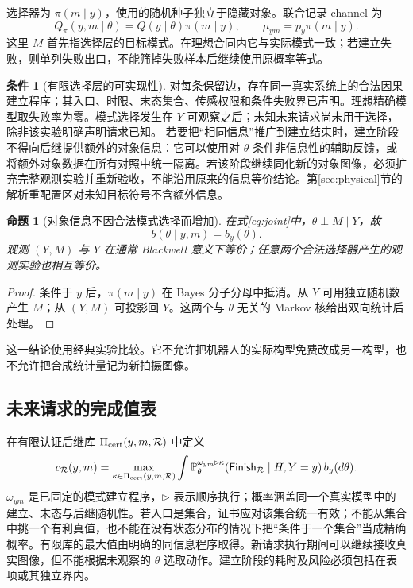 \documentclass[UTF8,11pt,a4paper,fontset=fandol]{ctexart}
\numberwithin{equation}{section}
\newtheorem{proposition}[theorem]{命题}
\theoremstyle{definition}
\newtheorem{assumption}[theorem]{条件}
\newcommand{\Pp}{\mathbb P}
\begin{document}
选择器为 $\pi(m\mid y)$，使用的随机种子独立于隐藏对象。联合记录 channel 为
\begin{equation}
Q_\pi(y,m\mid\theta)=Q(y\mid\theta)\pi(m\mid y),
\qquad
\mu_{ym}=p_y\pi(m\mid y).
\label{eq:joint}
\end{equation}
这里 $M$ 首先指选择层的目标模式。在理想合同内它与实际模式一致；若建立失败，则单列失败出口，不能筛掉失败样本后继续使用原概率等式。

\begin{assumption}[有限选择层的可实现性]
\label{ass:realizable}
对每条保留边，存在同一真实系统上的合法因果建立程序；其入口、时限、末态集合、传感权限和条件失败界已声明。理想精确模型取失败率为零。模式选择发生在 $Y$ 可观察之后；未知未来请求尚未用于选择，除非该实验明确声明请求已知。
若要把“相同信息”推广到建立结束时，建立阶段不得向后继提供额外的对象信息：它可以使用对 $\theta$ 条件非信息性的辅助反馈，或将额外对象数据在所有对照中统一隔离。若该阶段继续同化新的对象图像，必须扩充完整观测实验并重新验收，不能沿用原来的信息等价结论。第\ref{sec:physical}节的解析重配置区对未知目标符号不含额外信息。
\end{assumption}

\begin{proposition}[对象信息不因合法模式选择而增加]
\label{prop:blackwell}
在式\eqref{eq:joint}中，$\theta\perp M\mid Y$，故
\begin{equation}
b(\theta\mid y,m)=b_y(\theta).
\end{equation}
观测 $(Y,M)$ 与 $Y$ 在通常 Blackwell 意义下等价；任意两个合法选择器产生的观测实验也相互等价。
\end{proposition}
\begin{proof}
条件于 $y$ 后，$\pi(m\mid y)$ 在 Bayes 分子分母中抵消。从 $Y$ 可用独立随机数产生 $M$；从 $(Y,M)$ 可投影回 $Y$。这两个与 $\theta$ 无关的 Markov 核给出双向统计后处理。\end{proof}
这一结论使用经典实验比较\cite{blackwellmodern}。它不允许把机器人的实际构型免费改成另一构型，也不允许把合成统计量记为新拍摄图像。

\subsection{未来请求的完成值表}
在有限认证后继库 $\Pi_{\rm cert}(y,m,\mathcal R)$ 中定义
\begin{equation}
c_{\mathcal R}(y,m)=
\max_{\kappa\in\Pi_{\rm cert}(y,m,\mathcal R)}
\int\Pp_\theta^{\omega_{ym}\triangleright\kappa}
(\mathsf{Finish}_{\mathcal R}\mid H,Y=y)\,b_y(d\theta).
\label{eq:c}
\end{equation}
$\omega_{ym}$ 是已固定的模式建立程序，$\triangleright$ 表示顺序执行；概率涵盖同一个真实模型中的建立、末态与后继随机性。若入口是集合，证书应对该集合统一有效；不能从集合中挑一个有利真值，也不能在没有状态分布的情况下把“条件于一个集合”当成精确概率。有限库的最大值由明确的同信息程序取得。新请求执行期间可以继续接收真实图像，但不能根据未观察的 $\theta$ 选取动作。建立阶段的耗时及风险必须包括在表项或其独立界内。
\end{document}
